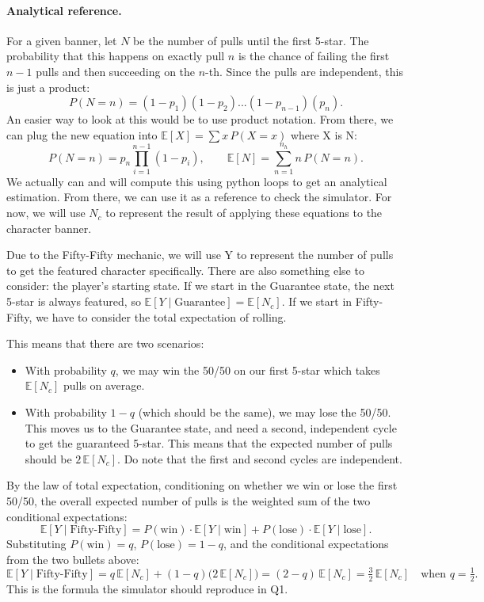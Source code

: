 \documentclass[11pt]{article}
\begin{document}
\paragraph{Analytical reference.} For a given banner, let $N$ be the number of pulls 
until the first 5-star. The probability that this happens on exactly pull $n$ is the chance of
failing the first $n - 1$ pulls and then succeeding on the $n$-th. 
Since the pulls are independent, this is just a product:
\[
P(N = n) = (1 - p_1)(1 - p_2) ... (1 - p_{n-1})(p_n).
\]
An easier way to look at this would be to use product notation. From there, we can plug the
new equation into $\mathbb{E}[X] = \sum x \,P(X=x)$ where X is N:
\begin{equation}
P(N = n) = p_n \prod_{i=1}^{n-1}(1 - p_i),
\qquad
\mathbb{E}[N] = \sum_{n=1}^{n_h} n \,P(N = n).
\end{equation}
We actually can and will compute this using python loops to get an analytical estimation.
From there, we can use it as a reference to check the simulator. For now, we will use
$N_c$ to represent the result of applying these equations to the character banner.

Due to the Fifty-Fifty mechanic, we will use Y to represent the number of pulls to get the
featured character specifically. There are also something else to consider: the player's starting
state. If we start in the Guarantee state, the next 5-star is always featured, so
$\mathbb{E}[Y \mid \text{Guarantee}] = \mathbb{E}[N_c]$. 
If we start in Fifty-Fifty, we have to consider the total expectation of rolling.

This means that there are two scenarios:

\begin{itemize}
\item With probability $q$, we may win the 50/50 on our first 5-star which
takes $\mathbb{E}[N_c]$ pulls on average.
\item With probability $1 - q$ (which should be the same), we may lose the 50/50. 
This moves us to the Guarantee state, and need a second, independent cycle to get 
the guaranteed 5-star. This means that the expected number of pulls should be
$2\,\mathbb{E}[N_c]$. Do note that the first and second cycles are independent.
\end{itemize}

By the law of total expectation, conditioning on whether we win or lose the
first 50/50, the overall expected number of pulls is the weighted sum of the
two conditional expectations:
\[
\mathbb{E}[Y \mid \text{Fifty-Fifty}]
= P(\text{win}) \cdot \mathbb{E}[Y \mid \text{win}]
+ P(\text{lose}) \cdot \mathbb{E}[Y \mid \text{lose}].
\]
Substituting $P(\text{win}) = q$, $P(\text{lose}) = 1 - q$, and the
conditional expectations from the two bullets above:
\begin{equation}
 \mathbb{E}[Y \mid \text{Fifty-Fifty}]
= q\,\mathbb{E}[N_c] + (1 - q)\bigl(2\,\mathbb{E}[N_c]\bigr)
= (2 - q)\,\mathbb{E}[N_c]
= \tfrac{3}{2}\,\mathbb{E}[N_c]
\quad \text{when } q = \tfrac{1}{2}.
\end{equation}
This is the formula the simulator should reproduce in Q1.
\end{document}
